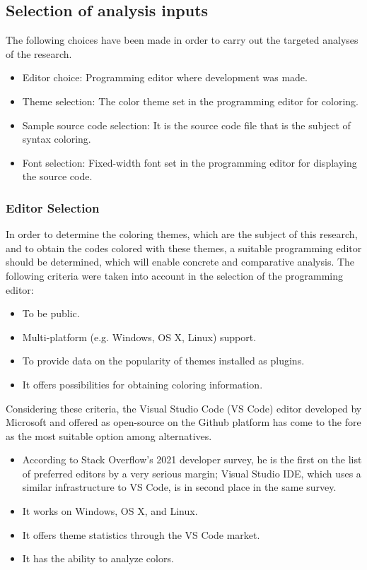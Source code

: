 \documentclass{article}
\begin{document}
\subsection{Selection of analysis inputs} \label{sec:material-methods.inputs}

The following choices have been made in order to carry out the targeted analyses of the research.

\begin{itemize}
  \item Editor choice: Programming editor where development was made.
  \item Theme selection: The color theme set in the programming editor for coloring. 
  \item Sample source code selection: It is the source code file that is the subject of syntax coloring.
  \item Font selection: Fixed-width font set in the programming editor for displaying the source code.
\end{itemize}

\subsubsection{Editor Selection} \label{sec:material-methods.inputs.editor}

In order to determine the coloring themes, which are the subject of this research, and to obtain the codes colored with these themes, a suitable programming editor should be determined, which will enable concrete and comparative analysis. The following criteria were taken into account in the selection of the programming editor:

\begin{itemize}
  \item To be public.
  \item Multi-platform (e.g. Windows, OS X, Linux) support.
  \item To provide data on the popularity of themes installed as plugins.
  \item It offers possibilities for obtaining coloring information.
\end{itemize}

Considering these criteria, the Visual Studio Code (VS Code) editor developed by Microsoft and offered as open-source on the Github platform has come to the fore as the most suitable option among alternatives.

\begin{itemize}
  \item According to Stack Overflow's 2021 developer survey\cite{so2022survey}, he is the first on the list of preferred editors by a very serious margin; Visual Studio IDE, which uses a similar infrastructure to VS Code, is in second place in the same survey.
  \item It works on Windows, OS X, and Linux.
  \item It offers theme statistics\cite{vs2022thememarket} through the VS Code market.
  \item It has the ability to analyze colors.
\end{itemize}
\end{document}
